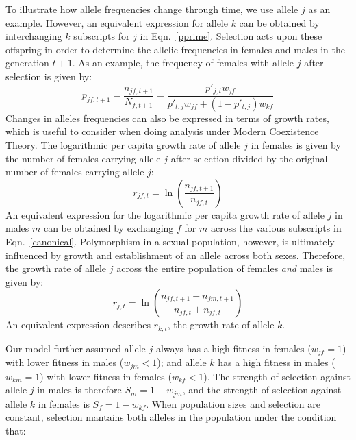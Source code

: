 \begin{refsection}
To illustrate how allele frequencies change through time, we use allele $j$ as an example. However, an equivalent expression for allele $k$ can be obtained by interchanging $k$ subscripts for $j$ in Eqn.~\ref{pprime}. Selection acts upon these offspring in order to determine the allelic frequencies in females and males in the generation $t+1$. As an example, the frequency  of females with allele $j$ after selection is given by:
\begin{equation}
   p_{jf, t+1}= \frac{n_{jf, t+1}}{N_{f,t+1}} = \frac{p'_{j,t}w_{jf}}{p'_{t,j}w_{jf}+ (1-p'_{t,j})w_{kf}}
   \label{next_gen}
\end{equation}
Changes in alleles frequencies can also be expressed in terms of growth rates, which is useful to consider when doing analysis under Modern Coexistence Theory. The logarithmic per capita growth rate of allele $j$ in females is given by the number of females carrying allele $j$ after selection divided by the original number of females carrying allele $j$:
\begin{equation}
    r_{jf,t} = \ln \left( \frac{n_{jf, t+1}}{n_{jf,t}} \right)
    \label{canonical}
\end{equation}
An equivalent expression for the logarithmic per capita growth rate of allele $j$ in males $m$ can be obtained by exchanging $f$ for $m$ across the various subscripts in Eqn.~\ref{canonical}. Polymorphism in a sexual population, however, is ultimately influenced by growth and establishment of an allele across both sexes. Therefore, the growth rate of allele $j$ across the entire population of females \emph{and} males is given by:
\begin{equation}
    r_{j,t} = \ln \left( \frac{n_{jf, t+1} + n_{jm, t+1} }{n_{jf,t} + n_{jf,t} }  \right)
    \label{full}
\end{equation}
An equivalent expression describes $r_{k,t}$, the growth rate of allele $k$.


Our model further assumed allele $j$ always has a high fitness in females ($w_{jf} = 1$) with lower fitness in males ($w_{jm} < 1$); and allele $k$ has a high fitness in males ($w_{km} = 1$)  with lower fitness in females ($w_{kf} < 1 $). The strength of selection against allele $j$ in males is therefore $S_{m}= 1 - w_{jm}$, and the strength of selection against allele $k$ in females is $S_{f}= 1 - w_{kf}$. When population sizes and selection are constant,
selection mantains both alleles in the population under the condition that:


\end{refsection}
